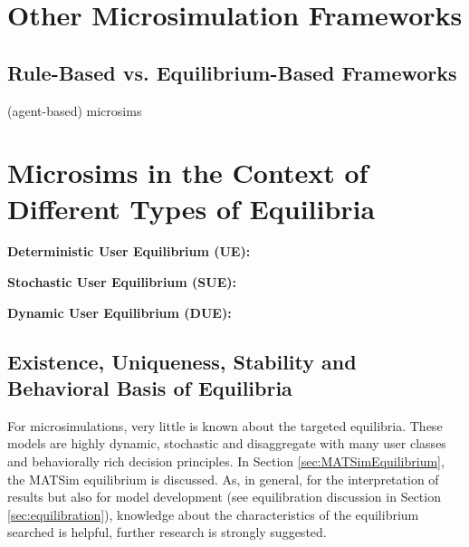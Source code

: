 \section{Other Microsimulation Frameworks}
\subsection{Rule-Based vs. Equilibrium-Based Frameworks}

(agent-based) microsims

\section{Microsims in the Context of Different Types of Equilibria}
\label{sec:types}

\textbf{Deterministic User Equilibrium (UE):}

\textbf{Stochastic User Equilibrium (SUE):}
 
\textbf{Dynamic User Equilibrium (DUE):}

\subsection{Existence, Uniqueness, Stability and Behavioral Basis of Equilibria}
For microsimulations, very little is known about the targeted equilibria. These models are highly dynamic, stochastic and disaggregate with many user classes and behaviorally rich decision principles. In Section \ref{sec:MATSimEquilibrium}, the MATSim equilibrium is discussed. As, in general, for the interpretation of results but also for model development (see equilibration discussion in Section \ref{sec:equilibration}), knowledge about the characteristics of the equilibrium searched is helpful, further research is strongly suggested.



